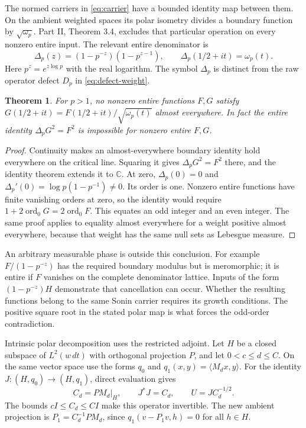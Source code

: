 \documentclass[11pt,letterpaper]{article}
\newtheorem{theorem}{Theorem}[section]
\theoremstyle{definition}
\theoremstyle{remark}
\newcommand{\C}{\mathbb C}
\newcommand{\ord}{\operatorname{ord}}
\begin{document}
The normed carriers in \eqref{eq:carrier} have a bounded identity
map between them. On the ambient weighted spaces its polar
isometry divides a boundary function by $\sqrt{\omega_p}$.
Part II, Theorem 3.4, excludes that particular operation on every
nonzero entire input. The relevant entire denominator is
\begin{equation}
 \Delta_p(z)=(1-p^{-z})(1-p^{z-1}),\qquad
 \Delta_p(1/2+it)=\omega_p(t).
 \label{eq:Delta}
\end{equation}
Here $p^z=e^{z\log p}$ with the real logarithm.
The symbol $\Delta_p$ is distinct from the raw operator defect
$D_p$ in \eqref{eq:defect-weight}.

\begin{theorem}\label{thm:entire}
For $p>1$, no nonzero entire functions $F,G$ satisfy
$G(1/2+it)=F(1/2+it)/\sqrt{\omega_p(t)}$ almost everywhere.
In fact the entire identity $\Delta_pG^2=F^2$ is impossible
for nonzero entire $F,G$.
\end{theorem}
\begin{proof}
Continuity makes an almost-everywhere boundary identity hold
everywhere on the critical line. Squaring it gives
$\Delta_pG^2=F^2$ there, and the identity theorem extends it to
$\C$. At zero, $\Delta_p(0)=0$ and
$\Delta_p'(0)=\log p(1-p^{-1})\ne0$. Its order is one.
Nonzero entire functions have finite vanishing orders at zero,
so the identity would require
$1+2\ord_0G=2\ord_0F$. This equates an odd integer and an even
integer. The same proof applies to equality almost everywhere
for a weight positive almost everywhere, because that weight
has the same null sets as Lebesgue measure.
\end{proof}

An arbitrary measurable phase is outside this conclusion.
For example $F/(1-p^{-z})$ has the required boundary modulus
but is meromorphic; it is entire if $F$ vanishes on the complete
denominator lattice. Inputs of the form $(1-p^{-z})H$ demonstrate
that cancellation can occur. Whether the resulting functions
belong to the same Sonin carrier requires its growth conditions.
The positive square root in the stated polar map is what forces
the odd-order contradiction.

Intrinsic polar decomposition uses the restricted adjoint. Let
$H$ be a closed subspace of $L^2(w\,dt)$ with orthogonal
projection $P$, and let $0<c\le d\le C$. On the same vector
space use the forms $q_0$ and $q_1(x,y)=\langle M_dx,y\rangle$.
For the identity $J:(H,q_0)\to(H,q_1)$, direct evaluation gives
\begin{equation}
 C_d=PM_d|_H,\qquad J^*J=C_d,\qquad U=JC_d^{-1/2}.
 \label{eq:compressed}
\end{equation}
The bounds $cI\le C_d\le CI$ make this operator invertible.
The new ambient projection is $P_1=C_d^{-1}PM_d$, since
$q_1(v-P_1v,h)=0$ for all $h\in H$.
\end{document}
